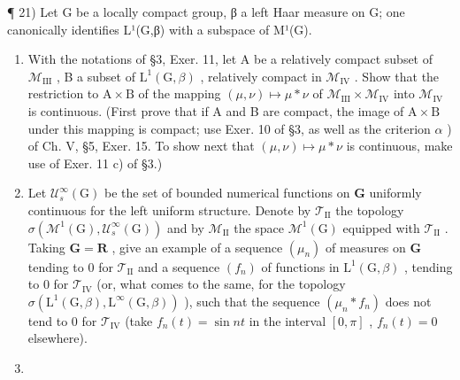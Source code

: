 ¶ 21) Let G be a locally compact group, β a left Haar measure on G; one canonically identifies L¹(G,β) with a subspace of M¹(G).

\begin{enumerate}
\def\labelenumi{\alph{enumi})}
\item
  With the notations of §3, Exer. 11, let A be a relatively compact subset of \(\mathcal{M}_{\mathrm{III}}\) , B a subset of \(\mathrm{L}^1 (\mathrm{G},\beta)\) , relatively compact in \(\mathcal{M}_{\mathrm{IV}}\) . Show that the restriction to \(\mathrm{A}\times \mathrm{B}\) of the mapping \((\mu ,\nu)\mapsto \mu *\nu\) of \(\mathcal{M}_{\mathrm{III}}\times \mathcal{M}_{\mathrm{IV}}\) into \(\mathcal{M}_{\mathrm{IV}}\) is continuous. (First prove that if A and B are compact, the image of \(\mathrm{A}\times \mathrm{B}\) under this mapping is compact; use Exer. 10 of §3, as well as the criterion \(\alpha\) ) of Ch. V, §5, Exer. 15. To show next that \((\mu ,\nu)\mapsto \mu *\nu\) is continuous, make use of Exer. 11 c) of §3.)
\item
  Let \(\mathcal{U}_s^\infty (\mathrm{G})\) be the set of bounded numerical functions on \(\mathbf{G}\) uniformly continuous for the left uniform structure. Denote by \(\mathcal{T}_{\mathrm{II}}\) the topology \(\sigma (\mathcal{M}^1 (\mathrm{G}),\mathcal{U}_s^\infty (\mathrm{G}))\) and by \(\mathcal{M}_{\mathrm{II}}\) the space \(\mathcal{M}^1 (\mathrm{G})\) equipped with \(\mathcal{T}_{\mathrm{II}}\) . Taking \(\mathbf{G} = \mathbf{R}\) , give an example of a sequence \((\mu_n)\) of measures on \(\mathbf{G}\) tending to 0 for \(\mathcal{T}_{\mathrm{II}}\) and a sequence \((f_n)\) of functions in \(\mathrm{L}^1 (\mathrm{G},\beta)\) , tending to 0 for \(\mathcal{T}_{\mathrm{IV}}\) (or, what comes to the same, for the topology \(\sigma (\mathrm{L}^1 (\mathrm{G},\beta),\mathrm{L}^\infty (\mathrm{G},\beta))\) ), such that the sequence \((\mu_n*f_n)\) does not tend to 0 for \(\mathcal{T}_{\mathrm{IV}}\) (take \(f_{n}(t) = \sin nt\) in the interval \([0,\pi ]\) , \(f_{n}(t) = 0\) elsewhere).
\item

\end{enumerate}
